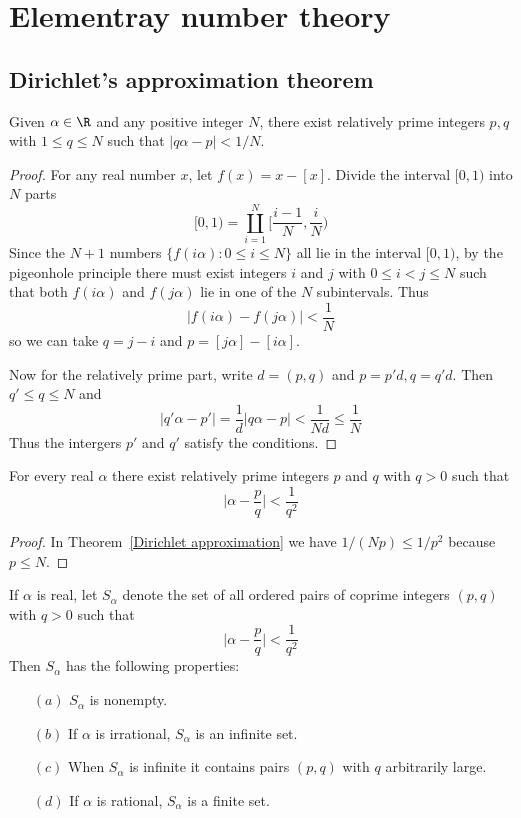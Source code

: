 \chapter{Elementray number theory}
\section{Dirichlet's approximation theorem}
\begin{theorem}\label{Dirichlet approximation}
Given $\alpha\in\R$ and any positive integer $N$, there exist relatively prime integers $p,q$ with $1\leq q\leq N$ such that $|q\alpha-p|<1/N$.
\end{theorem}
\begin{proof}
For any real number $x$, let $f(x)=x-[x]$. Divide the interval $[0,1)$ into $N$ parts
\[[0,1)=\coprod_{i=1}^{N}[\frac{i-1}{N},\frac{i}{N})\]
Since the $N+1$ numbers $\{f(i\alpha):0\leq i\leq N\}$ all lie in the interval $[0,1)$, by the pigeonhole principle there must exist integers $i$ and $j$ with $0\leq i<j\leq N$ such that both $f(i\alpha)$ and $f(j\alpha)$ lie in one of the $N$ subintervals. Thus 
\[|f(i\alpha)-f(j\alpha)|<\frac{1}{N}\]
so we can take $q=j-i$ and $p=[j\alpha]-[i\alpha]$.\par
Now for the relatively prime part, write $d=(p,q)$ and $p=p'd,q=q'd$. Then $q'\leq q\leq N$ and
\[|q'\alpha-p'|=\frac{1}{d}|q\alpha-p|<\frac{1}{Nd}\leq\frac{1}{N}\]
Thus the intergers $p'$ and $q'$ satisfy the conditions.
\end{proof}
\begin{corollary}
For every real $\alpha$ there exist relatively prime integers $p$ and $q$ with $q>0$ such that
\[\Big|\alpha-\frac{p}{q}\Big|<\frac{1}{q^2}\]
\end{corollary}
\begin{proof}
In Theorem~\ref{Dirichlet approximation} we have $1/(Np)\leq 1/p^2$ because $p\leq N$.
\end{proof}
\begin{theorem}\label{real number irrational iff}
If $\alpha$ is real, let $S_\alpha$ denote the set of all ordered pairs of coprime integers
$(p,q)$ with $q>0$ such that
\[\Big|\alpha-\frac{p}{q}\Big|<\frac{1}{q^2}\]
Then $S_\alpha$ has the following properties:
\begin{itemize}
\item[$(a)$]$S_\alpha$ is nonempty.
\item[$(b)$]If $\alpha$ is irrational, $S_\alpha$ is an infinite set.
\item[$(c)$]When $S_\alpha$ is infinite it contains pairs $(p,q)$ with $q$ arbitrarily large.
\item[$(d)$]If $\alpha$ is rational, $S_\alpha$ is a finite set.
\end{itemize}
\end{theorem}
